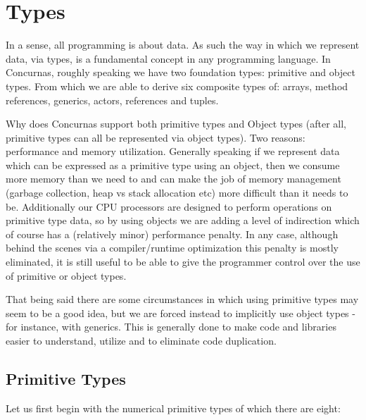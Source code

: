 \documentclass[conc-doc]{subfiles}
\begin{document}
\chapter[Types]{Types}


In a sense, all programming is about data. As such the way in which we represent data, via types, is a fundamental concept in any programming language. In Concurnas, roughly speaking we have two foundation types: primitive and object types. From which we are able to derive six composite types of: arrays, method references, generics, actors, references and tuples.

Why does Concurnas support both primitive types and Object types (after all, primitive types can all be represented via object types). Two reasons: performance and memory utilization. Generally speaking if we represent data which can be expressed as a primitive type using an object, then we consume more memory than we need to and can make the job of memory management (garbage collection, heap vs stack allocation etc) more difficult than it needs to be. Additionally our CPU processors are designed to perform operations on primitive type data, so by using objects we are adding a level of indirection which of course has a (relatively minor) performance penalty. In any case, although behind the scenes via a compiler/runtime optimization this penalty is mostly eliminated, it is still useful to be able to give the programmer control over the use of primitive or object types.

That being said there are some circumstances in which using primitive types may seem to be a good idea, but we are forced instead to implicitly use object types - for instance, with generics. This is generally done to make code and libraries easier to understand, utilize and to eliminate code duplication.

\section{Primitive Types}
Let us first begin with the numerical primitive types of which there are eight: 
\end{document}
